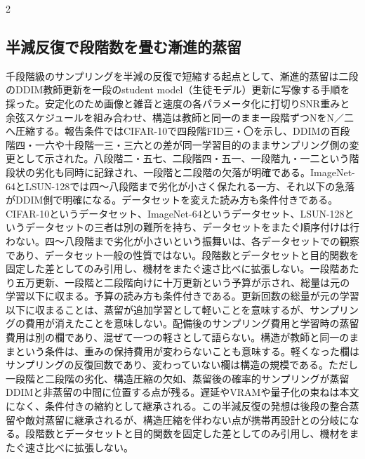 \documentclass[lualatex,a4paper,10pt]{jlreq}
\begin{document}
\begin{multicols}{2}
\subsection{半減反復で段階数を畳む漸進的蒸留}
千段階級のサンプリングを半減の反復で短縮する起点として、漸進的蒸留は二段のDDIM教師更新を一段のstudent model（生徒モデル）更新に写像する手順を採った。安定化のため画像と雑音と速度の各パラメータ化に打切りSNR重みと余弦スケジュールを組み合わせ、構造は教師と同一のまま一段階ずつNをN／二へ圧縮する\autocite{btd078}。報告条件ではCIFAR-10で四段階FID三・〇を示し、DDIMの百段階四・一六や十段階一三・三六との差が同一学習目的のままサンプリング側の変更として示された。八段階二・五七、二段階四・五一、一段階九・一二という階段状の劣化も同時に記録され、一段階と二段階の欠落が明確である。ImageNet-64とLSUN-128では四〜八段階まで劣化が小さく保たれる一方、それ以下の急落がDDIM側で明確になる\autocite{btd078}。データセットを変えた読み方も条件付きである。CIFAR-10というデータセット、ImageNet-64というデータセット、LSUN-128というデータセットの三者は別の難所を持ち、データセットをまたぐ順序付けは行わない。四〜八段階まで劣化が小さいという振舞いは、各データセットでの観察であり、データセット一般の性質ではない。段階数とデータセットと目的関数を固定した差としてのみ引用し、機材をまたぐ速さ比べに拡張しない。一段階あたり五万更新、一段階と二段階向けに十万更新という予算が示され、総量は元の学習以下に収まる\autocite{btd078}。予算の読み方も条件付きである。更新回数の総量が元の学習以下に収まることは、蒸留が追加学習として軽いことを意味するが、サンプリングの費用が消えたことを意味しない。配備後のサンプリング費用と学習時の蒸留費用は別の欄であり、混ぜて一つの軽さとして語らない。構造が教師と同一のままという条件は、重みの保持費用が変わらないことも意味する。軽くなった欄はサンプリングの反復回数であり、変わっていない欄は構造の規模である\autocite{btd078}。ただし一段階と二段階の劣化、構造圧縮の欠如、蒸留後の確率的サンプリングが蒸留DDIMと非蒸留の中間に位置する点が残る。遅延やVRAMや量子化の束ねは本文になく、条件付きの縮約として継承される。この半減反復の発想は後段の整合蒸留や敵対蒸留に継承されるが、構造圧縮を伴わない点が携帯再設計との分岐になる。段階数とデータセットと目的関数を固定した差としてのみ引用し、機材をまたぐ速さ比べに拡張しない。


\end{multicols}
\end{document}

